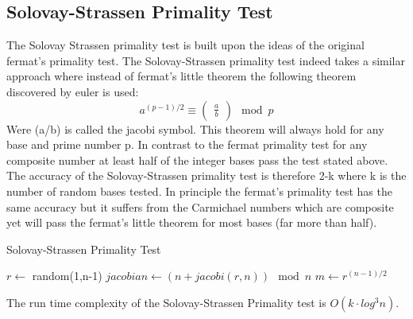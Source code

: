\documentclass[compressed,final,notitlepage,narroweqnarray,inline,twoside,]{ieee}
\begin{document}
\subsection{Solovay-Strassen Primality Test}
The Solovay Strassen primality test \cite{SS} is built upon the ideas of the original fermat’s primality test. The Solovay-Strassen primality test indeed takes a similar approach where instead of fermat’s little theorem the following theorem discovered by euler is used:
\begin{equation}
a^{(p-1)/2} \equiv \begin{pmatrix}\frac{a}{b}\end{pmatrix} \mod p
\end{equation}
Were (a/b) is called the jacobi symbol. This theorem will always hold for any base and prime number p. In contrast to the fermat primality test for any composite  number at least half of the integer bases pass the test stated above. The accuracy of the Solovay-Strassen primality test is therefore 2-k where k is the number of random bases tested. In principle the fermat’s primality test has the same accuracy but it suffers from the Carmichael numbers which are composite yet will pass the fermat’s little theorem for most bases (far more than half).  
\begin{algorithm}[ht]
 \caption{Solovay-Strassen Primality Test}
 {
 	\;
 }
 {
	$r \longleftarrow$ random(1,n-1) \;
	$jacobian \longleftarrow (n+jacobi(r,n)) \mod n$ \;
	$m \longleftarrow r^{(n-1)/2}$ \;
	{
		\;
	}
 }
 \;
\end{algorithm}
The run time complexity of the Solovay-Strassen Primality test is $O(k \cdot log^3 n)$. 
\end{document}
